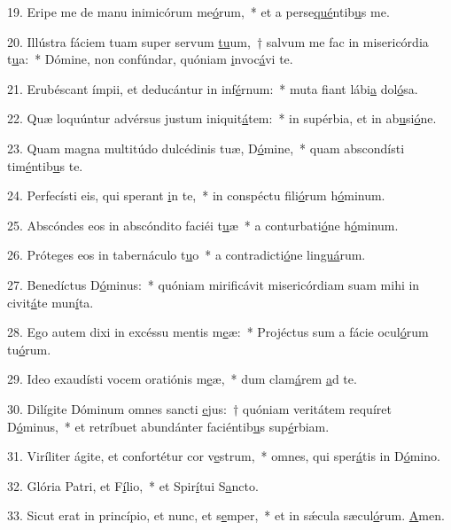 19. Eripe me de manu inimicórum me\uline{ó}rum,~* et a perse\uline{qué}ntib\uline{u}s me.\par 
20. Illústra fáciem tuam super servum \uline{tu}um,~† salvum me fac in misericórdia t\uline{u}a:~* Dómine, non confúndar, quóniam \uline{i}nvoc\uline{á}vi te.\par 
21. Erubéscant ímpii, et deducántur in inf\uline{é}rnum:~* muta fiant lábi\uline{a} dol\uline{ó}sa.\par 
22. Quæ loquúntur advérsus justum iniquit\uline{á}tem:~* in supérbia, et in ab\uline{u}si\uline{ó}ne.\par 
23. Quam magna multitúdo dulcédinis tuæ, D\uline{ó}mine,~* quam abscondísti tim\uline{é}ntib\uline{u}s te.\par 
24. Perfecísti eis, qui sperant \uline{i}n te,~* in conspéctu fili\uline{ó}rum h\uline{ó}minum.\par 
25. Abscóndes eos in abscóndito faciéi t\uline{u}æ~* a conturbati\uline{ó}ne h\uline{ó}minum.\par 
26. Próteges eos in tabernáculo t\uline{u}o~* a contradicti\uline{ó}ne lin\uline{guá}rum.\par 
27. Benedíctus D\uline{ó}minus:~* quóniam mirificávit misericórdiam suam mihi in civit\uline{á}te mun\uline{í}ta.\par 
28. Ego autem dixi in excéssu mentis m\uline{e}æ:~* Projéctus sum a fácie ocul\uline{ó}rum tu\uline{ó}rum.\par 
29. Ideo exaudísti vocem oratiónis m\uline{e}æ,~* dum clam\uline{á}rem \uline{a}d te.\par 
30. Dilígite Dóminum omnes sancti \uline{e}jus:~† quóniam veritátem requíret D\uline{ó}minus,~* et retríbuet abundánter faciéntib\uline{u}s sup\uline{é}rbiam.\par 
31. Viríliter ágite, et confortétur cor v\uline{e}strum,~* omnes, qui sper\uline{á}tis in D\uline{ó}mino.\par 
32. Glória Patri, et F\uline{í}lio,~* et Spir\uline{í}tui S\uline{a}ncto.\par 
33. Sicut erat in princípio, et nunc, et s\uline{e}mper,~* et in sǽcula sæcul\uline{ó}rum. \uline{A}men.\par 
